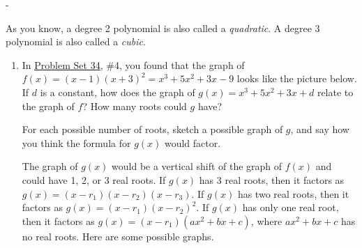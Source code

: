 \documentclass{article}
\makeatletter
\newlength{\tipmargin}
\renewenvironment{framed}{
  \setlength{\tipmargin}{\textwidth-\linewidth}
  \advance\@totalleftmargin-\tipmargin
  \def\FrameCommand{\hspace{\tipmargin}\fbox}%
  \advance\linewidth\tipmargin
  \MakeFramed {\advance\hsize-\width \FrameRestore}%
}
{\endMakeFramed}
\makeatother
\begin{document}
\begin{framed}
  As you know, a degree 2 polynomial is also called a \emph{quadratic}. A degree 3 polynomial is also called a \emph{cubic}.
\end{framed}

\begin{enumerate}[resume, topsep=0pt]
\item  \label{graph-cubic-with-repeated-root-followup}


  \begin{problem}[\newpage]
    In \href{https://people.math.harvard.edu/~jjchen/mathma/docs/homework/PS34.html}{Problem Set 34}, {{\#4}}, you found that the graph of $f(x) = (x-1)(x+3)^2 = x^3 + 5x^2 + 3x - 9$ looks like the picture below. If $d$ is a constant, how does the graph of $g(x) = x^3 + 5x^2 + 3x + d$ relate to the graph of $f$? How many roots could $g$ have?

    For each possible number of roots, sketch a possible graph of $g$, and say how you think the formula for $g(x)$ would factor.


  \end{problem}

  \begin{solution}
    The graph of $g(x)$ would be a vertical shift of the graph of
    $f(x)$ and could have 1, 2, or 3 real roots. If $g(x)$ has 3
    real roots, then it factors as $g(x)=(x-r_1)(x-r_2)(x-r_3)$. If
    $g(x)$ has two real roots, then it factors as $g(x)=(x-r_1)(x-r_2)^2$.
    If $g(x)$ has only one real root, then it factors as $g(x)=(x-r_1)(ax^2+bx+c)$, where $ax^2+bx+c$ has no real roots. Here are some
    possible graphs.
    \begin{center}
    \end{center}
    

\end{solution}
\end{enumerate}
\end{document}
